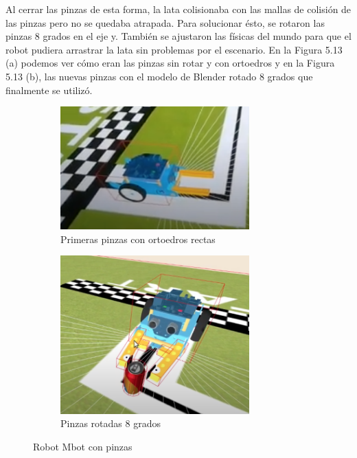 Al cerrar las pinzas de esta forma, la lata colisionaba con las mallas de colisión de las pinzas pero no se quedaba atrapada. Para solucionar ésto, se rotaron las pinzas 8 grados en el eje y. También se ajustaron las físicas del mundo para que el robot pudiera arrastrar la lata sin problemas por el escenario. En la Figura 5.13 (a) podemos ver cómo eran las pinzas sin rotar y con ortoedros y en la Figura 5.13 (b), las nuevas pinzas con el modelo de Blender rotado 8 grados que finalmente se utilizó.


\begin{figure}[H]
  \begin{subfigure}[b]{0.5\textwidth}
  \centering
    \includegraphics[width=0.8\textwidth, height=0.5\textwidth]{chapters/images/pinzarecta.png}
    \caption{Primeras pinzas con ortoedros rectas}
    \label{fig:f1}
  \end{subfigure}
  \hfill
  \begin{subfigure}[b]{0.5\textwidth}
  \centering
    \includegraphics[width=0.8\textwidth, height=0.5\textwidth]{chapters/images/pinzaok.png}
	\caption{Pinzas rotadas 8 grados}    
    \label{fig:f2}
 
  \end{subfigure}
  \caption{Robot Mbot con pinzas}
\end{figure}

